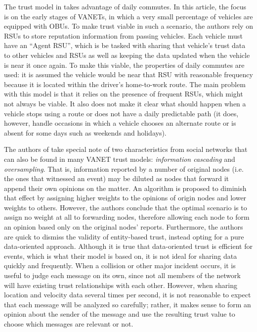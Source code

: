 The trust model in \cite{park2011long} takes advantage of daily commutes.
In this article, the focus is on the early stages of VANETs, in which a very small percentage of vehicles are equipped with OBUs.
To make trust viable in such a scenario, the authors rely on RSUs to store reputation information from passing vehicles.
Each vehicle must have an ``Agent RSU'', which is be tasked with sharing that vehicle's trust data to other vehicles and RSUs as well as keeping the data updated when the vehicle is near it once again.
To make this viable, the properties of daily commutes are used: it is assumed the vehicle would be near that RSU with reasonable frequency because it is located within the driver's home-to-work route.
The main problem with this model is that it relies on the presence of frequent RSUs, which might not always be viable.
It also does not make it clear what should happen when a vehicle stops using a route or does not have a daily predictable path (it does, however, handle occasions in which a vehicle chooses an alternate route or is absent for some days such as weekends and holidays).

The authors of \cite{huang2014social} take special note of two characteristics from social networks that can also be found in many VANET trust models: \textit{information cascading} and \textit{oversampling}.
That is, information reported by a number of original nodes (i.e. the ones that witnessed an event) may be diluted as nodes that forward it append their own opinions on the matter.
An algorithm is proposed to diminish that effect by assigning higher weights to the opinions of origin nodes and lower weights  to others.
However, the authors conclude that the optimal scenario is to assign no weight at all to forwarding nodes, therefore allowing each node to form an opinion based only on the original nodes' reports.
Furthermore, the authors are quick to dismiss the validity of entity-based trust, instead opting for a pure data-oriented approach.
Although it is true that data-oriented trust is efficient for events, which is what their model is based on, it is not ideal for sharing data quickly and frequently.
When a collision or other major incident occurs, it is useful to judge each message on its own, since not all members of the network will have existing trust relationships with each other.
However, when sharing location and velocity data several times per second, it is not reasonable to expect that each message will be analyzed so carefully; rather, it makes sense to form an opinion about the sender of the message and use the resulting trust value to choose which messages are relevant or not.

